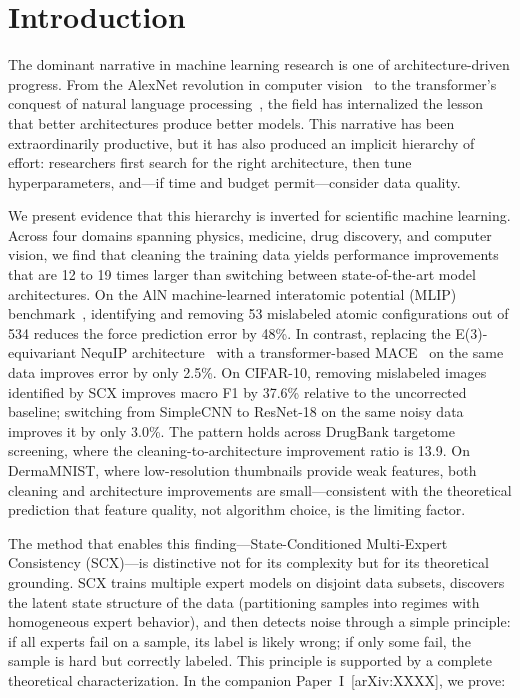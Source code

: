\section{Introduction}

The dominant narrative in machine learning research is one of architecture-driven progress. From the AlexNet revolution in computer vision~\cite{krizhevsky2012imagenet} to the transformer's conquest of natural language processing~\cite{vaswani2017attention}, the field has internalized the lesson that better architectures produce better models. This narrative has been extraordinarily productive, but it has also produced an implicit hierarchy of effort: researchers first search for the right architecture, then tune hyperparameters, and---if time and budget permit---consider data quality.

We present evidence that this hierarchy is inverted for scientific machine learning. Across four domains spanning physics, medicine, drug discovery, and computer vision, we find that cleaning the training data yields performance improvements that are 12 to 19 times larger than switching between state-of-the-art model architectures. On the AlN machine-learned interatomic potential (MLIP) benchmark~\cite{shapeev2016moment}, identifying and removing 53 mislabeled atomic configurations out of 534 reduces the force prediction error by 48\%. In contrast, replacing the E(3)-equivariant NequIP architecture~\cite{batzner2022e3nn} with a transformer-based MACE~\cite{batatia2022mace} on the same data improves error by only 2.5\%. On CIFAR-10, removing mislabeled images identified by SCX improves macro F1 by 37.6\% relative to the uncorrected baseline; switching from SimpleCNN to ResNet-18 on the same noisy data improves it by only 3.0\%. The pattern holds across DrugBank targetome screening, where the cleaning-to-architecture improvement ratio is 13.9. On DermaMNIST, where low-resolution thumbnails provide weak features, both cleaning and architecture improvements are small---consistent with the theoretical prediction that feature quality, not algorithm choice, is the limiting factor.

The method that enables this finding---State-Conditioned Multi-Expert Consistency (SCX)---is distinctive not for its complexity but for its theoretical grounding. SCX trains multiple expert models on disjoint data subsets, discovers the latent state structure of the data (partitioning samples into regimes with homogeneous expert behavior), and then detects noise through a simple principle: if all experts fail on a sample, its label is likely wrong; if only some fail, the sample is hard but correctly labeled. This principle is supported by a complete theoretical characterization. In the companion Paper~I~[arXiv:XXXX], we prove:

